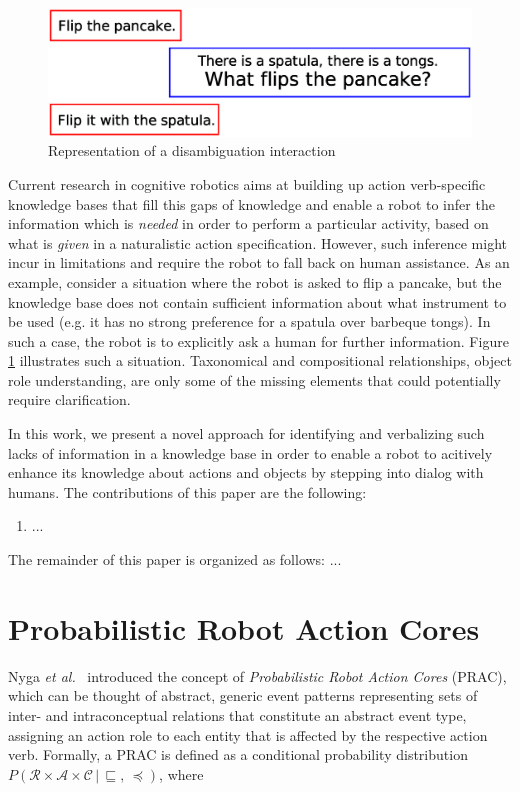 \documentclass[oribibl]{llncs}
\begin{document}
\begin{figure}[tbp]
\includegraphics[width=.9\columnwidth]{introduction.eps}
\caption{Representation of a disambiguation interaction}
\label{fig:application}
\end{figure} 

Current research in cognitive robotics aims at building up action 
verb-specific knowledge bases that fill this gaps of knowledge and 
enable a robot to infer the information which is \textit{needed} in 
order to perform a particular activity, based on what is \textit 
{given} in a naturalistic action specification. However, such 
inference might incur in limitations and require the robot to fall 
back on human assistance. As an example, consider a situation where 
the robot is asked to flip a pancake, but the knowledge base does 
not contain sufficient information about what instrument to be used 
(e.g. it has no strong preference for a spatula over barbeque 
tongs). In such a case, the robot is to explicitly ask a human for 
further information. Figure \ref{fig:application} illustrates such a 
situation. Taxonomical and compositional relationships, object role 
understanding, are only some of the missing elements that could 
potentially require clarification. 

In this work, we present a novel approach for identifying and 
verbalizing such lacks of information in a knowledge base in order to enable
a robot to acitively enhance its knowledge about actions and objects
by stepping into dialog with humans. The contributions of this paper
are the following:
\begin{enumerate}
    \item ...
\end{enumerate}
The remainder of this paper is organized as follows: ...


\section{Probabilistic Robot Action Cores}

Nyga \emph{et al.}~\cite{nyga12actioncore} introduced the concept of 
\emph{Probabilistic Robot Action Cores} (PRAC), which can be thought of abstract,
generic event patterns representing sets of 
inter- and intraconceptual relations that constitute an abstract 
event type, assigning an action role to each entity that is affected 
by the respective action verb. Formally, a PRAC is defined as a conditional
probability distribution
$P\left(\mathcal{R}\times\mathcal{A}\times\mathcal{C}\,|\,\sqsubseteq
,\, \preceq \right)\nonumber$, where 
\end{document}
